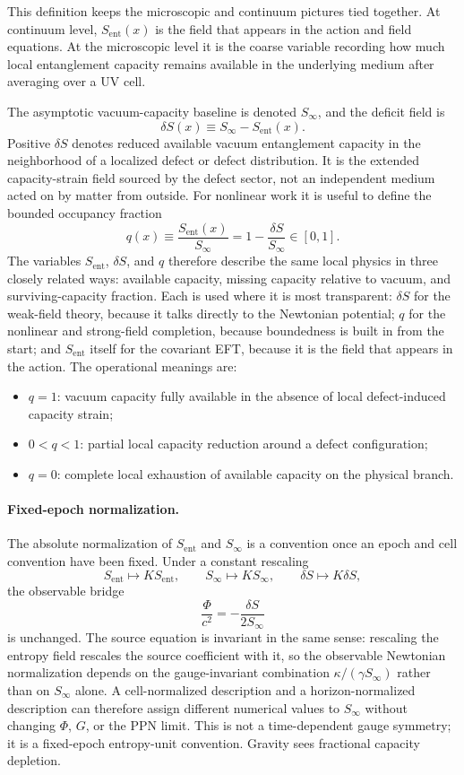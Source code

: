 \documentclass[11pt]{article}
\begin{document}
This definition keeps the microscopic and continuum pictures tied together. At continuum level, $S_{\mathrm{ent}}(x)$ is the field that appears in the action and field equations. At the microscopic level it is the coarse variable recording how much local entanglement capacity remains available in the underlying medium after averaging over a UV cell.

The asymptotic vacuum-capacity baseline is denoted $S_\infty$, and the deficit field is
\[
\delta S(x)\equiv S_\infty-S_{\mathrm{ent}}(x).
\]
Positive $\delta S$ denotes reduced available vacuum entanglement capacity in the neighborhood of a localized defect or defect distribution. It is the extended capacity-strain field sourced by the defect sector, not an independent medium acted on by matter from outside. For nonlinear work it is useful to define the bounded occupancy fraction
\[
q(x)\equiv \frac{S_{\mathrm{ent}}(x)}{S_\infty}=1-\frac{\delta S}{S_\infty}\in[0,1].
\]
The variables $S_{\mathrm{ent}}$, $\delta S$, and $q$ therefore describe the same local physics in three closely related ways: available capacity, missing capacity relative to vacuum, and surviving-capacity fraction. Each is used where it is most transparent: $\delta S$ for the weak-field theory, because it talks directly to the Newtonian potential; $q$ for the nonlinear and strong-field completion, because boundedness is built in from the start; and $S_{\mathrm{ent}}$ itself for the covariant EFT, because it is the field that appears in the action.
The operational meanings are:
\begin{itemize}
\item $q=1$: vacuum capacity fully available in the absence of local defect-induced capacity strain;
\item $0<q<1$: partial local capacity reduction around a defect configuration;
\item $q=0$: complete local exhaustion of available capacity on the physical branch.
\end{itemize}

\paragraph{Fixed-epoch normalization.}
The absolute normalization of $S_{\mathrm{ent}}$ and $S_\infty$ is a convention once an epoch and cell convention have been fixed. Under a constant rescaling
\[
S_{\mathrm{ent}}\mapsto K S_{\mathrm{ent}},
\qquad
S_\infty\mapsto K S_\infty,
\qquad
\delta S\mapsto K\delta S,
\]
the observable bridge
\[
\frac{\Phi}{c^2}=-\frac{\delta S}{2S_\infty}
\]
is unchanged. The source equation is invariant in the same sense: rescaling the entropy field rescales the source coefficient with it, so the observable Newtonian normalization depends on the gauge-invariant combination $\kappa/(\gamma S_\infty)$ rather than on $S_\infty$ alone. A cell-normalized description and a horizon-normalized description can therefore assign different numerical values to $S_\infty$ without changing $\Phi$, $G$, or the PPN limit. This is not a time-dependent gauge symmetry; it is a fixed-epoch entropy-unit convention. Gravity sees fractional capacity depletion.
\end{document}
